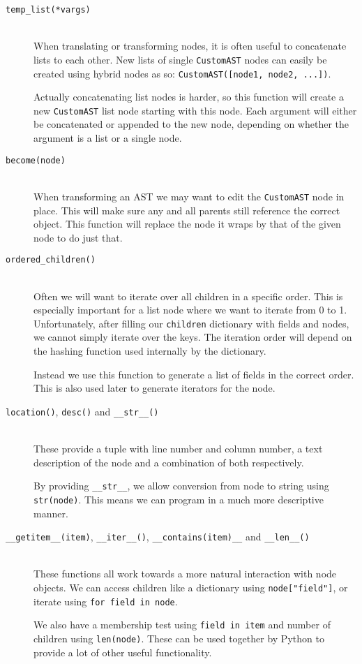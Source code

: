 \documentclass[twoside,a4paper]{report}
\begin{document}
\begin{description}
\item[\texttt{temp\_list(*vargs)}] \hfill \\
When translating or transforming nodes, it is often useful to concatenate lists to each other. New lists of single \texttt{CustomAST} nodes can easily be
created using hybrid nodes as so: \texttt{CustomAST([node1, node2, ...])}.

Actually concatenating list nodes is harder, so this function will create a new \texttt{CustomAST} list node starting with this node. Each argument will either be
concatenated or appended to the new node, depending on whether the argument is a list or a single node.

\item[\texttt{become(node)}] \hfill \\
When transforming an AST we may want to edit the \texttt{CustomAST} node in place. This will make sure any and all parents still reference the correct
object. This function will replace the node it wraps by that of the given node to do just that.

\item[\texttt{ordered\_children()}] \hfill \\
Often we will want to iterate over all children in a specific order. This is especially important for a list node where we want to iterate from 0 to 1.
Unfortunately, after filling our \texttt{children} dictionary with fields and nodes, we cannot simply iterate over the keys. The iteration order will
depend on the hashing function used internally by the dictionary.

Instead we use this function to generate a list of fields in the correct order. This is also used later to generate iterators for the node.

\item[\texttt{location()}, \texttt{desc()} and \texttt{\_\_str\_\_()}] \hfill \\
These provide a tuple with line number and column number, a text description of the node and a combination of both respectively.

By providing \texttt{\_\_str\_\_}, we allow conversion from node to string using \texttt{str(node)}. This means we can program in a much more
descriptive manner.

\item[\texttt{\_\_getitem\_\_(item)}, \texttt{\_\_iter\_\_()}, \texttt{\_\_contains(item)\_\_} and \texttt{\_\_len\_\_()}] \hfill \\
These functions all work towards a more natural interaction with node objects. We can access children like a dictionary using \texttt{node["field"]}, or
iterate using \texttt{for field in node}.

We also have a membership test using \texttt{field in item} and number of children using \texttt{len(node)}. These can be used together by Python to provide
a lot of other useful functionality.

\end{description}
\end{document}
